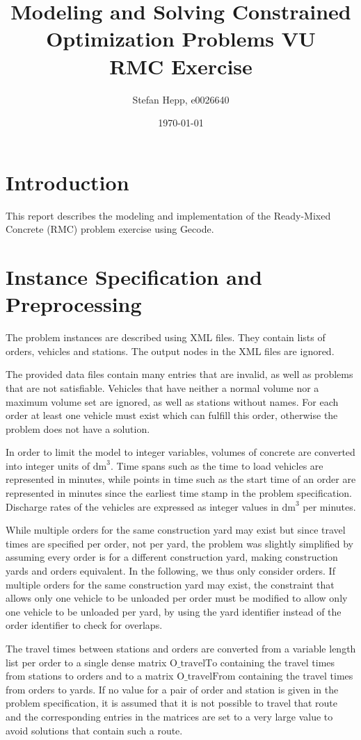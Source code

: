 \documentclass[a4paper]{article}
\author{Stefan Hepp, e0026640}
\title{Modeling and Solving Constrained Optimization Problems VU\\
  {\normalsize RMC Exercise}}
\date{\today}
\newcommand{\dm}{\text{dm}^3}
\newcommand{\OtravelTo}{\text{O\_travelTo}}
\newcommand{\OtravelFrom}{\text{O\_travelFrom}}
\begin{document}
\maketitle

\section{Introduction}

This report describes the modeling and implementation of the Ready-Mixed Concrete (RMC) problem exercise using Gecode.

\section{Instance Specification and Preprocessing}

The problem instances are described using XML files. They contain lists of orders, vehicles and stations. The output
nodes in the XML files are ignored.

The provided data files contain many entries that are invalid, as well as problems that are not satisfiable. Vehicles
that have neither a normal volume nor a maximum volume set are ignored, as well as stations without names. For each
order at least one vehicle must exist which can fulfill this order, otherwise the problem does not have a solution. 

In order to limit the model to integer variables, volumes of concrete are converted into integer units of $\dm$. Time
spans such as the time to load vehicles are represented in minutes, while points in time such as the start time of an
order are represented in minutes since the earliest time stamp in the problem specification. 
Discharge rates of the vehicles are expressed as integer values in $\dm$ per minutes.

While multiple orders for the same construction yard may exist but since travel
times are specified per order, not per yard, the problem was slightly simplified by assuming every order is for a
different construction yard, making construction yards and orders equivalent.
In the following, we thus only consider orders. If multiple orders for the same construction yard may exist, the 
constraint that allows only one vehicle to be unloaded per order must be modified to allow only one vehicle to be
unloaded per yard, by using the yard identifier instead of the order identifier to check for overlaps.

The travel times between stations and orders are converted from a variable length list per order to a single dense
matrix $\OtravelTo$ containing the 
travel times from stations to orders and to a matrix $\OtravelFrom$ containing the travel times from orders to yards.
If no value for a pair of order and station is given in the problem specification, it is assumed that it is not possible
to travel that route and the corresponding entries in the matrices are set to a very large value to avoid solutions that
contain such a route.
\end{document}
